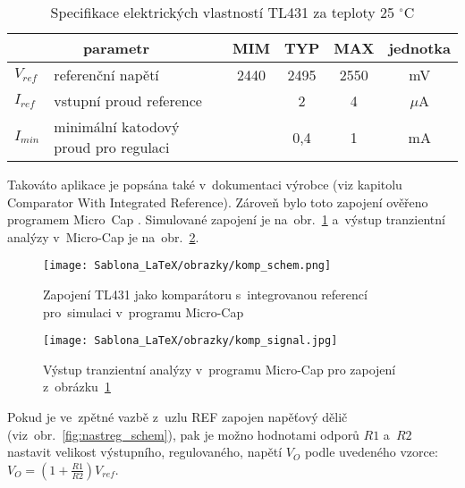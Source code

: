 \documentclass[12pt]{CLASS/protokol}
\begin{document}
    \begin{table}[h]
    \centering
    \caption{Specifikace elektrických vlastností TL431 za teploty 25 $^\circ$C}
    \label{tab:el_char}
    \begin{tabular}{llcccc}
    \multicolumn{2}{c}{\textbf{parametr}}              & \multicolumn{1}{l}{\textbf{MIM}} & \multicolumn{1}{l}{\textbf{TYP}} & \multicolumn{1}{l}{\textbf{MAX}} & \multicolumn{1}{l}{\textbf{jednotka}} \\ \hline
    $V_{ref}$ & referenční napětí                     & 2440                             & 2495                             & 2550                             & mV                                    \\
    $I_{ref}$ & vstupní proud reference               &                                  & 2                                & 4                                & $\mu$A                                \\
    $I_{min}$ & minimální katodový proud pro regulaci &                                  & 0,4                              & 1                                & mA                                   
    \end{tabular}
    \end{table}
    
    \par
    Takováto aplikace je popsána také v~dokumentaci výrobce (viz kapitolu Comparator With Integrated Reference). Zároveň bylo toto zapojení ověřeno programem Micro~Cap \cite{Micro_Cap}. Simulované zapojení je na~obr.~\ref{fig:komp_schem} a~výstup tranzientní analýzy v~Micro-Cap je na~obr.~\ref{fig:komp_tran}.

    \begin{figure}[h]
        \centering
        \texttt{[image: Sablona\_LaTeX/obrazky/komp\_schem.png]}
        \caption{Zapojení TL431 jako komparátoru s~integrovanou referencí pro~simulaci v~programu Micro-Cap \cite{Micro_Cap}}
        \label{fig:komp_schem}
    \end{figure}

    \begin{figure}[h]
        \centering
        \texttt{[image: Sablona\_LaTeX/obrazky/komp\_signal.jpg]}
        \caption{Výstup tranzientní analýzy v~programu Micro-Cap pro zapojení z~obrázku~\ref{fig:komp_schem} \cite{Micro_Cap}}
        \label{fig:komp_tran}
    \end{figure}

    \clearpage
    \par
    Pokud je ve~zpětné vazbě z~uzlu REF zapojen napěťový dělič (viz~obr.~\ref{fig:nastreg_schem}), pak je možno hodnotami odporů $R1$ a~$R2$ nastavit velikost výstupního, regulovaného, napětí $V_O$ podle uvedeného vzorce: $V_O=\left(1+\frac{R1}{R2}\right)V_{ref}$.\cite{TI_TL431_datasheet}
\end{document}
